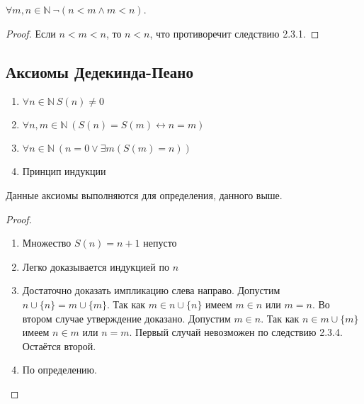 \begin{corollary} 
	$\forall m, n \in \mathbb{N} \ \neg(n<m \wedge m<n)$.
\end{corollary}

\begin{proof} 
	Если $n<m<n$, то $n<n$, что противоречит следствию 2.3.1. 
\end{proof}

\subsection{Аксиомы Дедекинда-Пеано}

\begin{enumerate}

	\item $ \forall n \in \mathbb{N} \  S(n) \not= 0$ 

	\item $ \forall n,m \in \mathbb{N} \ (S(n)=S(m) \leftrightarrow n = m)$ 

	\item $ \forall n \in \mathbb{N} \ (n = 0 \lor \exists m (S(m) = n))$ 

	\item Принцип индукции 

\end{enumerate}

Данные аксиомы выполняются для определения, данного выше.

\begin{proof}

	\begin{enumerate}

		\item Множество $S(n)=n+1$ непусто 

		\item Легко доказывается индукцией по $n$ 

		\item Достаточно доказать импликацию слева направо. Допустим $n \cup\{n\}=m \cup\{m\}$. Так как $m \in n
			\cup\{n\}$ имеем $m \in n$ или
			$m = n$. Во втором случае утверждение доказано. Допустим $m \in n$. Так
			как $n \in m \cup\{m\}$ имеем $n \in m$ или $n = m$. Первый случай невозможен
			по следствию 2.3.4. Остаётся второй. 

		\item По определению. 
	\end{enumerate}
\end{proof}
